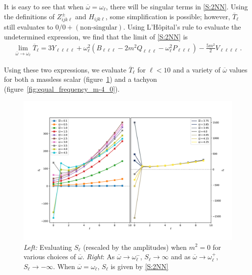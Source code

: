 \documentclass[letterpaper,11pt]{article}
\newcommand{\ol}{\omega_\ell}
\newcommand{\ob}{\overline{\omega}}
\begin{document}
It is easy to see that when $\ob = \ol$, there will be singular terms in \eqref{S:2NN}. Using the definitions of $Z^\pm_{ijk\ell}$ and $H_{ijk\ell}$, some simplification is possible; however, $\overline{T}_\ell$ still evaluates to $0/0 + (\text{non-singular})$. Using L'H\^{o}pital's rule to evaluate the undetermined expression, we find that the limit of \eqref{S:2NN} is
\begin{align}
\label{Tbar limit}
\lim_{\ob \to \ol} \overline{T}_\ell = 3Y_{\ell \ell \ell \ell} + \ol^2 \left( B_{\ell \ell \ell} - 2m^2 Q_{\ell \ell \ell} - \ol^2 P_{\ell \ell \ell} \right) - \frac{5m^2}{2} V_{\ell \ell \ell \ell} \, .
\end{align}

Using these two expressions, we evaluate $\overline{T}_\ell$ for $\ell < 10$ and a variety of $\ob$ values for both a massless scalar (figure~\ref{fig:equal_frequency_m0}) and a tachyon (figure~\ref{fig:equal_frequency_m-4_0}).

\begin{figure}
\centering
\includegraphics[width=\textwidth]{./figures/NN_equalfreq_sourceterms_m0_0+zoom}
\caption{{\it Left:} Evaluating $S_\ell$ (rescaled by the amplitudes) when $m^2 = 0$ for various choices of $\ob$. {\it Right}: As $\ob \to \ol^-$, $S_\ell \to \infty$ and as $\ob \to \ol^+$, $S_\ell \to -\infty$. When $\ob = \ol$, $S_\ell$ is given by \eqref{S:2NN}}
\label{fig:equal_frequency_m0}
\end{figure}
\end{document}
